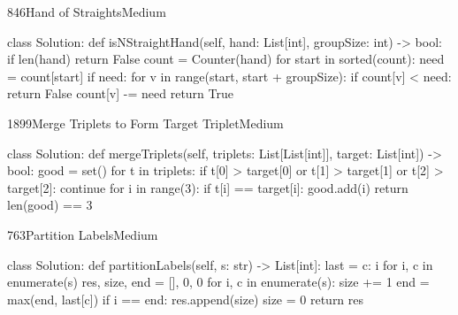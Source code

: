 \begin{problem}{846}{Hand of Straights}{Medium}
\begin{code}
class Solution:
    def isNStraightHand(self, hand: List[int], groupSize: int) -> bool:
        if len(hand) %
            return False
        count = Counter(hand)
        for start in sorted(count):
            need = count[start]
            if need:
                for v in range(start, start + groupSize):
                    if count[v] < need:
                        return False
                    count[v] -= need
        return True
\end{code}
\end{problem}

\begin{problem}{1899}{Merge Triplets to Form Target Triplet}{Medium}
\begin{code}
class Solution:
    def mergeTriplets(self, triplets: List[List[int]], target: List[int]) -> bool:
        good = set()
        for t in triplets:
            if t[0] > target[0] or t[1] > target[1] or t[2] > target[2]:
                continue
            for i in range(3):
                if t[i] == target[i]:
                    good.add(i)
        return len(good) == 3
\end{code}
\end{problem}

\begin{problem}{763}{Partition Labels}{Medium}
\begin{code}
class Solution:
    def partitionLabels(self, s: str) -> List[int]:
        last = {c: i for i, c in enumerate(s)}
        res, size, end = [], 0, 0
        for i, c in enumerate(s):
            size += 1
            end = max(end, last[c])
            if i == end:
                res.append(size)
                size = 0
        return res
\end{code}
\end{problem}

